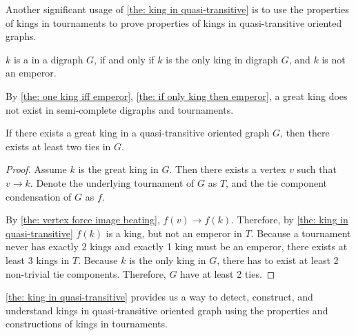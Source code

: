 Another significant usage of \cref{the: king in quasi-transitive}
is to use the properties of kings in tournaments to prove
properties of kings in quasi-transitive oriented graphs.

\begin{definition}
  \(k\) is a  in a digraph \(G\),
  if and only if \(k\) is the only king in digraph \(G\),
  and \(k\) is not an emperor.
\end{definition}

By \cref{the: one king iff emperor},
\cref{the: if only king then emperor},
a great king does not exist in semi-complete digraphs and
tournaments.

\begin{corollary}
  If there exists a great king in a
  quasi-transitive oriented graph \(G\),
  then there exists at least two ties in \(G\).
\end{corollary}

\begin{proof}
  Assume \(k\) is the great king in \(G\).
  Then there exists a vertex  \(v\) such that \(v \to k\).
  Denote the underlying tournament of \(G\) as \(T\),
  and the tie component condensation of \(G\) as \(f\).

  By \cref{the: vertex force image beating}, \(f(v) \to f(k)\).
  Therefore, by \cref{the: king in quasi-transitive}
  \(f(k)\) is a king, but not an emperor in \(T\).
  Because a tournament never has exactly 2 kings
  and exactly 1 king must be an emperor,
  there exists at least 3 kings in \(T\).
  Because \(k\) is the only king in \(G\),
  there has to exist at least 2 non-trivial tie components.
  Therefore, \(G\) have at least 2 ties.
\end{proof}

\cref{the: king in quasi-transitive}
provides us a way to detect, construct, and understand kings
in quasi-transitive oriented graph using
the properties and constructions of kings in tournaments.
